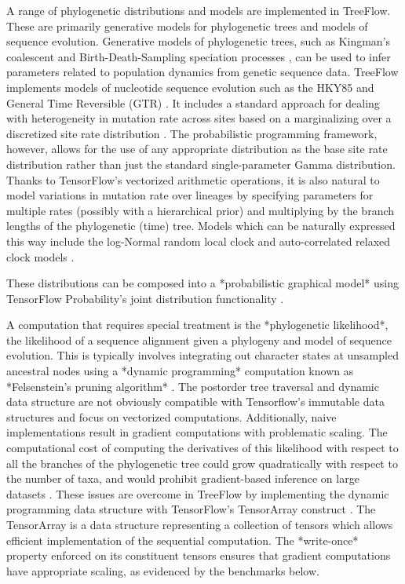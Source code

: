 A range of phylogenetic distributions and models are implemented in TreeFlow. These are primarily generative models for phylogenetic trees and models of sequence evolution. Generative models of phylogenetic trees, such as Kingman's coalescent \cite{kuhner1995estimating} and Birth-Death-Sampling speciation processes \cite{stadler2009incomplete}, can be used to infer parameters related to population dynamics from genetic sequence data. TreeFlow implements models of nucleotide sequence evolution such as the HKY85 \cite{hasegawa1985dating} and General Time Reversible (GTR) \cite{tavare1986some}. It includes a standard approach for dealing with heterogeneity in mutation rate across sites based on a marginalizing over a discretized site rate distribution \cite{yang1994maximum}. The probabilistic programming framework, however, allows for the use of any appropriate distribution as the base site rate distribution rather than just the standard single-parameter Gamma distribution. Thanks to TensorFlow's vectorized arithmetic operations, it is also natural to model variations in mutation rate over lineages by specifying parameters for multiple rates (possibly with a hierarchical prior) and multiplying by the branch lengths of the phylogenetic (time) tree. Models which can be naturally expressed this way include the log-Normal random local clock \cite{drummond2006relaxed} and auto-correlated relaxed clock models \cite{thorne1998estimating}.

These distributions can be composed into a *probabilistic graphical model* using TensorFlow Probability's joint distribution functionality \cite{piponi2020joint}.


A computation that requires special treatment is the *phylogenetic likelihood*, the likelihood of a sequence alignment given a phylogeny and model of sequence evolution. This is typically involves integrating out character states at unsampled ancestral nodes using a *dynamic programming* computation known as *Felsenstein's pruning algorithm* \cite{felsenstein1981evolutionary}. The postorder tree traversal and dynamic data structure are not obviously compatible with Tensorflow's immutable data structures and focus on vectorized computations. Additionally, naive implementations result in gradient computations with problematic scaling. The computational cost of computing the derivatives of this likelihood with respect to all the branches of the phylogenetic tree could grow quadratically with respect to the number of taxa, and would prohibit gradient-based inference on large datasets \cite{ji2020gradients}. These issues are overcome in TreeFlow by implementing the dynamic programming data structure with TensorFlow's TensorArray construct \cite{yu2018dynamic}. The TensorArray is a data structure representing a collection of tensors which allows efficient implementation of the sequential computation. The *write-once* property enforced on its constituent tensors ensures that gradient computations have appropriate scaling, as evidenced by the benchmarks below.

